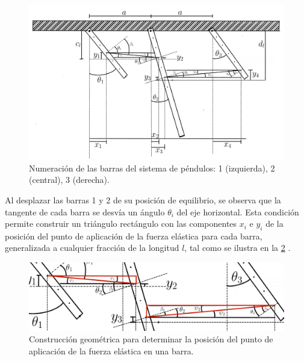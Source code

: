 \begin{figure}[htbp!]
  \centering
  \includegraphics[width=0.8\linewidth]{Figures/Ilustración_sin_título 4.pdf}
  \caption{Numeraci\'on de las barras del sistema de p\'endulos:
  1 (izquierda), 2 (central), 3 (derecha).}
  \label{fig:enumeracion_barras}
\end{figure}

Al desplazar las barras 1 y 2 de su posici\'on de equilibrio, se
observa que la tangente de cada barra se desv\'ia un \'angulo
$\theta_i$ del eje horizontal. Esta condici\'on permite
construir un tri\'angulo rect\'angulo con las componentes $x_i$ e
$y_i$ de la posici\'on del punto de aplicaci\'on de la fuerza
el\'astica para cada barra, generalizada a cualquier fracci\'on de
la longitud $l$, tal como se ilustra en la \cref{fig:triangulo_posicion}
.

\begin{figure}[htbp!]
  \centering
  \includegraphics[width=0.8\linewidth]{Figures/Ilustración_sin_título 5.pdf}
  \caption{Construcci\'on geom\'etrica para determinar la posici\'on
  del punto de aplicaci\'on de la fuerza el\'astica en una barra.}
  \label{fig:triangulo_posicion}
\end{figure}

